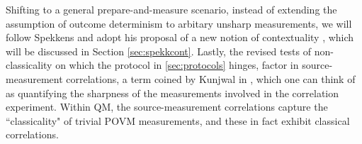 \begin{itemize}
Shifting to a general prepare-and-measure scenario, instead of extending the assumption of outcome determinism to arbitary unsharp measurements, we will follow Spekkens and adopt his proposal of a new notion of contextuality \cite{Spekkens2005}, which will be discussed in Section \ref{sec:spekkcont}.
Lastly, the revised tests of non-classicality on which the protocol in \ref{sec:protocols} hinges, factor in source-measurement correlations, a term coined by Kunjwal in \cite{Kunjwal2019}, which one can think of as quantifying the sharpness of the measurements involved in the correlation experiment. Within QM, the source-measurement correlations capture the ``classicality" of trivial POVM measurements, and these in fact exhibit classical correlations.
\end{itemize}